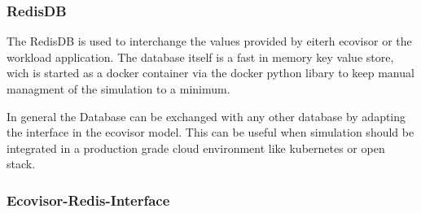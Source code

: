 \subsubsection{RedisDB}
The RedisDB is used to interchange the values provided by eiterh ecovisor or the workload application. The database itself is a fast in memory key value store, wich is started as a docker container via the docker python libary %
to keep manual managment of the simulation to a minimum. 

In general the Database can be exchanged with any other database by adapting the interface in the ecovisor model. This can be useful when simulation should be integrated 
in a production grade cloud environment like kubernetes or open stack.


\subsubsection{Ecovisor-Redis-Interface}

